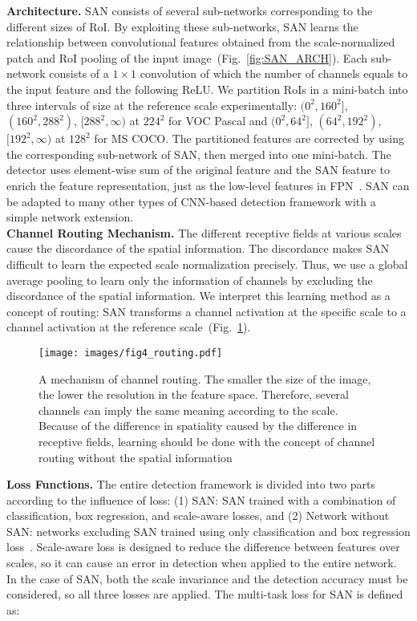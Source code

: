 \documentclass[runningheads]{llncs}
\begin{document}
\noindent
\textbf{Architecture.}
SAN consists of several sub-networks corresponding to the different sizes of RoI.
By exploiting these sub-networks, SAN learns the relationship between convolutional features obtained from the scale-normalized patch and RoI pooling of the input image~(Fig.~\ref{fig:SAN_ARCH}).
Each sub-network consists of a $1\times1$ convolution of which the number of channels equals to the input feature and the following ReLU.
We partition RoIs in a mini-batch into three intervals of size at the reference scale experimentally:
$(0^2,160^2]$, $(160^2,288^2)$, $[288^2,\infty)$ at $224^2$ for VOC Pascal
and
$(0^2,64^2]$, $(64^2,192^2)$, $[192^2,\infty)$ at $128^2$ for MS COCO.
The partitioned features are corrected by using the corresponding sub-network of SAN, then merged into one mini-batch.
The detector uses element-wise sum of the original feature and the SAN feature to enrich the feature representation, just as the low-level features in FPN~\cite{lin2017feature}.
SAN can be adapted to many other types of CNN-based detection framework with a simple network extension.
\\

\noindent
\textbf{Channel Routing Mechanism.}
The different receptive fields at various scales cause the discordance of the spatial information.
The discordance makes SAN difficult to learn the expected scale normalization precisely.
Thus, we use a global average pooling to learn only the information of channels by excluding the discordance of the spatial information.
We interpret this learning method as a concept of routing: SAN transforms a channel activation at the specific scale to a channel activation at the reference scale~(Fig.~\ref{fig:SAN_CHANNEL_ROUTING}).
\\



\begin{figure}[t]
	\texttt{[image: images/fig4\_routing.pdf]}
	\caption{A mechanism of channel routing.
		The smaller the size of the image, the lower the resolution in the feature space.
		Therefore, several channels can imply the same meaning according to the scale.
		Because of the difference in spatiality caused by the difference in receptive fields, learning should be done with the concept of channel routing without the spatial information}
	\centering
	\label{fig:SAN_CHANNEL_ROUTING}
\end{figure}



\noindent
\textbf{Loss Functions.}
The entire detection framework is divided into two parts according to the influence of loss:
(1) SAN: SAN trained with a combination of classification, box regression, and scale-aware losses,
and (2) Network without SAN: networks excluding SAN trained using only classification and box regression loss~\cite{girshick2015fast,ren2015faster,li2016r}.
Scale-aware loss is designed to reduce the difference between features over scales, so it can cause an error in detection when applied to the entire network.
In the case of SAN, both the scale invariance and the detection accuracy must be considered, so all three losses are applied.
The multi-task loss for SAN is defined as:
\end{document}
